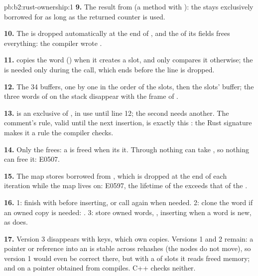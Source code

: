 \begin{solution}{pb:b2:rust-ownership:1}
\textbf{9.} The result  from  (a method with ): the  stays exclusively
borrowed for as long as the returned counter is used.

\textbf{10.} The  is dropped automatically at the end of , and the  of its fields frees
everything: the compiler wrote .

\textbf{11.}  copies the word () when it creates a slot, and only compares it otherwise;
the   is needed only during the call, which ends before the line is dropped.

\textbf{12.} The 34  buffers, one by one in the order of the slots, then the slots' buffer; the three
words of  on the stack disappear with the frame of .

\textbf{13.}  is an exclusive  of , in use until line 12; the second  needs
another. The comment's rule, valid until the next insertion, is exactly this : the Rust signature makes it a
rule the compiler checks.

\textbf{14.} Only the  frees: a  is freed when its   it. Through  nothing
can take , so nothing can free it: E0507.

\textbf{15.} The map stores  borrowed from , which is dropped at the end of each iteration while
the map lives on: E0597, the lifetime of the  exceeds that of the .

\textbf{16.} 1: finish with  before inserting, or call  again when needed. 2: clone
the word if an owned copy is needed: . 3: store owned words,
, inserting  when a word is new, as  does.

\textbf{17.} Version 3 disappears with  keys, which own copies. Versions 1 and 2 remain: a pointer
or reference into an  is stable across rehashes (the nodes do not move), so version 1 would even
be correct there, but with a  of slots it reads freed memory; and  on a pointer obtained
from  compiles. C++ checks neither.


\end{solution}
